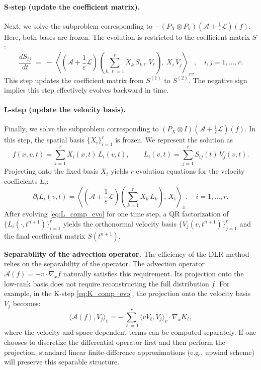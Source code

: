 \documentclass[]{article}
\numberwithin{equation}{section}
\begin{document}
\paragraph{S-step (update the coefficient matrix).}
Next, we solve the subproblem corresponding to \(-(P_X \otimes P_V)(\mathcal{A}+\frac{1}{\varepsilon}\mathcal{L})(f)\). Here, both bases are frozen. The evolution is restricted to the coefficient matrix \(S\):
\begin{equation}\label{eq:S_comp_evo}
    \frac{d S_{ij}}{dt}
    \;=\;
-\,\left\langle (\mathcal{A} + \frac{1}{\varepsilon}\mathcal{L}) \left(\sum_{k,\ell=1}^r X_k\,S_{k\ell}\,V_{\ell}\right),\; X_i\,V_j \right\rangle_{xv},
    \quad i,j=1,\dots,r.
\end{equation}
This step updates the coefficient matrix from \(S^{(1)}\) to \(S^{(2)}\). The negative sign implies this step effectively evolves backward in time.

\paragraph{L-step (update the velocity basis).}
Finally, we solve the subproblem corresponding to \((P_X \otimes I)(\mathcal{A}+\frac{1}{\varepsilon}\mathcal{L})(f)\). In this step, the spatial basis \(\{X_i\}_{i=1}^{r}\) is frozen. We  represent the solution as
\begin{equation}\label{eq:f_L_form}
    f(x,v,t) = \sum_{i=1}^r X_i(x,t)\,L_i(v,t), \qquad
    L_i(v,t) = \sum_{j=1}^r S_{ij}(t)\,V_j(v,t).
\end{equation}
Projecting onto the fixed basis \(X_i\) yields \(r\) evolution equations for the velocity coefficients \(L_i\):
\begin{equation}\label{eq:L_comp_evo}
    \partial_t L_i(v,t) = \left\langle (\mathcal{A} + \frac{1}{\varepsilon}\mathcal{L}) \left(\sum_{k=1}^r X_k\,L_k\right),\, X_i \right\rangle_x,
    \quad i=1,\dots,r.
\end{equation}
After evolving \eqref{eq:L_comp_evo} for one time step, a QR factorization of \(\{L_i(\cdot, t^{n+1})\}_{i=1}^{r}\) yields the orthonormal velocity basis \(\{V_j(v,t^{n+1})\}_{j=1}^{r}\) and the final coefficient matrix \(S(t^{n+1})\).

\medskip
\noindent\textbf{Separability of the advection operator.}
The efficiency of the DLR method relies on the separability of the operator. The advection operator $\mathcal{A}(f) = -v \cdot \nabla_x f$ naturally satisfies this requirement. Its projection onto the low-rank basis does not require reconstructing the full distribution $f$. For example, in the K-step \eqref{eq:K_comp_evo}, the projection onto the velocity basis $V_j$ becomes:
\[
  \langle \mathcal{A}(f), V_j \rangle_v
  = -\sum_{\ell=1}^r \langle vV_\ell,V_j\rangle_v\cdot \nabla_x K_\ell,
  \]
where the velocity and space dependent terms can be computed separately. If one chooses to discretize the differential operator first and then perform the projection, standard linear finite-difference approximations (e.g., upwind scheme) will preserve this separable structure.
\end{document}
